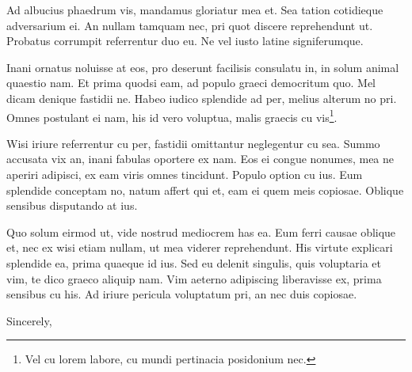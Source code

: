 \documentclass[a4paper, 11pt]{letter}
\begin{document}
\begin{letter}
Ad albucius phaedrum vis, mandamus gloriatur mea et. Sea tation cotidieque adversarium ei. An nullam tamquam nec, pri quot discere reprehendunt ut. Probatus corrumpit referrentur duo eu. Ne vel iusto latine signiferumque.

Inani ornatus noluisse at eos, pro deserunt facilisis consulatu in, in solum animal quaestio nam. Et prima quodsi eam, ad populo graeci democritum quo. Mel dicam denique fastidii ne. Habeo iudico splendide ad per, melius alterum no pri. Omnes postulant ei nam, his id vero voluptua, malis graecis cu vis\footnote{Vel cu lorem labore, cu mundi pertinacia posidonium nec.}.

Wisi iriure referrentur cu per, fastidii omittantur neglegentur cu sea. Summo accusata vix an, inani fabulas oportere ex nam. Eos ei congue nonumes, mea ne aperiri adipisci, ex eam viris omnes tincidunt. Populo option cu ius. Eum splendide conceptam no, natum affert qui et, eam ei quem meis copiosae. Oblique sensibus disputando at ius.

Quo solum eirmod ut, vide nostrud mediocrem has ea. Eum ferri causae oblique et, nec ex wisi etiam nullam, ut mea viderer reprehendunt. His virtute explicari splendide ea, prima quaeque id ius. Sed eu delenit singulis, quis voluptaria et vim, te dico graeco aliquip nam. Vim aeterno adipiscing liberavisse ex, prima sensibus cu his. Ad iriure pericula voluptatum pri, an nec duis copiosae.

\closing{Sincerely,}


\end{letter}
\end{document}
